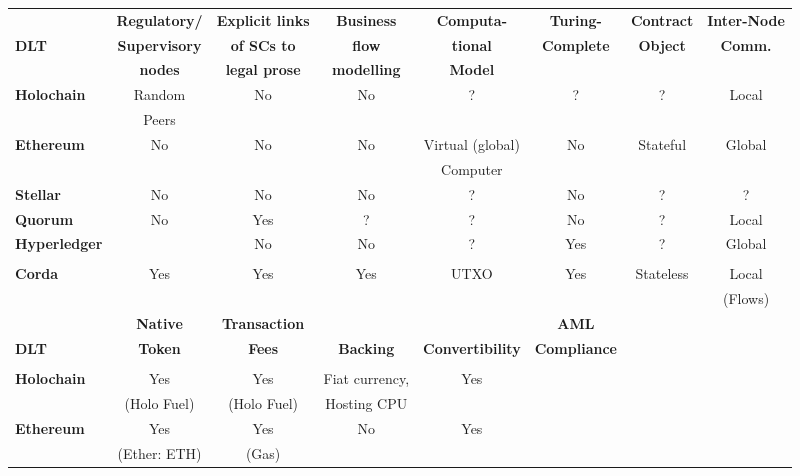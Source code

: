 \begin{table}
\small
\begin{centering}
{\begin{tabular}{| l | c | c | c | c | c | c | c |}
\hline
				& \textbf{Regulatory/} 	& \textbf{Explicit links}	&\textbf{Business}
				& \textbf{Computa-} 		& \textbf{Turing-}		&\textbf{Contract}	& \textbf{Inter-Node}	\\
\textbf{DLT}		& \textbf{Supervisory} 	& \textbf{of SCs to}		&\textbf{flow} 
				& \textbf{tional} 			& \textbf{Complete}		&\textbf{Object}		& \textbf{Comm.} \\
				& \textbf{nodes} 		& \textbf{legal prose}		&\textbf{modelling} 
				& \textbf{Model} 		& \textbf{}				&\textbf{} 			&\\
\hline
\hline
\textbf{Holochain}	&Random				&No			&No 		&?				&?
				&?					&Local \\
				&Peers				&			& 		&				&
				&					& \\
\hline
\textbf{Ethereum}	&No					&No			&No		&Virtual (global)			&No
				&Stateful 				&Global \\
				&					&			&		&Computer		&
				& 					& \\
\hline

\textbf{Stellar}		&No					&No			&No 		&?				&No
				&?					&? \\
\hline
\textbf{Quorum} 	&No					&Yes			&? 		&?				&No
				&?					&Local \\
\hline
\textbf{Hyperledger}	&					&No			&No 		&?				&Yes
				&?					&Global \\
 				&					&			& 		&				&
				&					& \\
\hline
\textbf{Corda} 		&Yes					&Yes			&Yes		&UTXO			&Yes	
				&Stateless			&Local \\
				&					&			&		&				&		
				&					&(Flows) \\
\hline
\hline
\hline
\hline
				& \textbf{Native} 		& \textbf{Transaction}&\textbf{}
				& \textbf{}  			& \textbf{AML}  		& \textbf{} 		& \\
\textbf{DLT}		& \textbf{Token} 		& \textbf{Fees}		&\textbf{Backing} 
				& \textbf{Convertibility}	& \textbf{Compliance} & \textbf{} 		& \textbf{} \\
				& \textbf{} 				& \textbf{}			&\textbf{}
				& \textbf{} 				& \textbf{} 			& \textbf{} 		&\\
\hline
\hline
\textbf{Holochain}	&Yes			&Yes			& Fiat currency,
				&Yes			&			&				& \\
				&(Holo Fuel)	&(Holo Fuel)	&Hosting CPU
				& 			&			&				& \\
\hline
\textbf{Ethereum}	&Yes			&Yes			&No 
				&Yes			&			&				& \\
				&(Ether: ETH)		&(Gas)		& 
				& 			&			&				& \\
\hline


\end{tabular}}
\end{centering}
\end{table}
